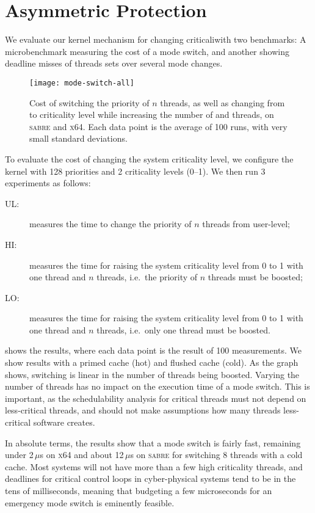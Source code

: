 \section{Asymmetric Protection}

We evaluate our kernel mechanism for changing criticaliwith two benchmarks: A
microbenchmark measuring the cost of a mode switch, and another showing deadline misses of threads sets over several mode changes.

\begin{figure}[t]
  \centering
  \texttt{[image: mode-switch-all]}
  \caption{Cost of switching the priority of $n$ threads, as well as changing from  to
   criticality level while increasing the number of  and  threads,
  on \textsc{sabre} and \textsc{x64}. Each data point is the average of 100 runs, with very small standard
  deviations.}
  \label{f:mode-switch}
\end{figure}

To evaluate the cost of changing the system criticality level, we
configure the kernel with 128 priorities and 2 criticality levels
(0--1). We then  run 3 experiments as follows:
\begin{description}
    \item[\textsc{UL}:] measures the time to change the priority of $n$ threads from user-level;
    \item[\textsc{HI}:] measures the time for raising the system criticality level from 0 to 1 with one  thread and $n$
     threads, i.e.\ the priority of $n$ threads must be boosted;
\item[\textsc{LO}:] measures the time for raising the system criticality level from 0 to 1 with one  thread and
    $n$  threads, i.e.\ only one thread must be boosted.
\end{description}

 shows the results, where each data point is the result of 100 measurements.
We show results with a primed cache (hot) and flushed cache (cold).
As the graph shows, switching is linear in the number of  threads being boosted. Varying the number
of  threads has no impact on the execution time of a mode switch.
This is important, as the schedulability analysis for critical threads
must not depend on less-critical threads, and should not make
assumptions how many threads less-critical software creates.

In absolute terms, the results show that a mode switch is fairly fast,
remaining under 2\,$\mu$s on \textsc{x64} and about 12\,\(\mu\)s on \textsc{sabre} for switching 8 threads
with a cold cache. Most systems will not have more than a few high
criticality threads, and deadlines for critical control loops in
cyber-physical systems tend to be in the tens of milliseconds, meaning
that budgeting a few microseconds for an emergency mode switch is eminently
feasible.

